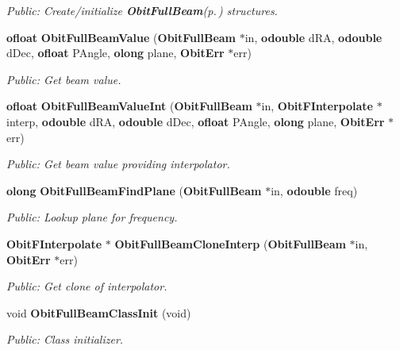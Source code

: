 \begin{CompactItemize}
\begin{CompactList}\small\item\em Public: Create/initialize {\bf Obit\-Full\-Beam}{\rm (p.\,\pageref{structObitFullBeam})} structures. \item\end{CompactList}\item 
{\bf ofloat} {\bf Obit\-Full\-Beam\-Value} ({\bf Obit\-Full\-Beam} $\ast$in, {\bf odouble} d\-RA, {\bf odouble} d\-Dec, {\bf ofloat} PAngle, {\bf olong} plane, {\bf Obit\-Err} $\ast$err)
\begin{CompactList}\small\item\em Public: Get beam value. \item\end{CompactList}\item 
{\bf ofloat} {\bf Obit\-Full\-Beam\-Value\-Int} ({\bf Obit\-Full\-Beam} $\ast$in, {\bf Obit\-FInterpolate} $\ast$interp, {\bf odouble} d\-RA, {\bf odouble} d\-Dec, {\bf ofloat} PAngle, {\bf olong} plane, {\bf Obit\-Err} $\ast$err)
\begin{CompactList}\small\item\em Public: Get beam value providing interpolator. \item\end{CompactList}\item 
{\bf olong} {\bf Obit\-Full\-Beam\-Find\-Plane} ({\bf Obit\-Full\-Beam} $\ast$in, {\bf odouble} freq)
\begin{CompactList}\small\item\em Public: Lookup plane for frequency. \item\end{CompactList}\item 
{\bf Obit\-FInterpolate} $\ast$ {\bf Obit\-Full\-Beam\-Clone\-Interp} ({\bf Obit\-Full\-Beam} $\ast$in, {\bf Obit\-Err} $\ast$err)
\begin{CompactList}\small\item\em Public: Get clone of interpolator. \item\end{CompactList}\item 
void {\bf Obit\-Full\-Beam\-Class\-Init} (void)
\begin{CompactList}\small\item\em Public: Class initializer. \item\end{CompactList}\end{CompactItemize}


